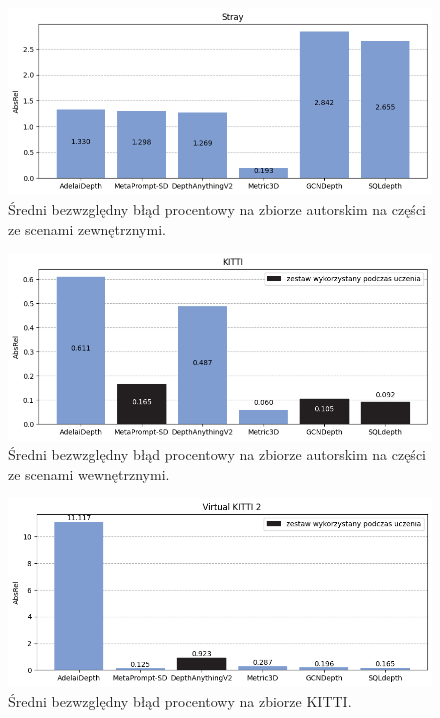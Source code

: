 \begin{figure}[H]
    \centering
    \includegraphics{plots/absrel/3}
    \caption{Średni bezwzględny błąd procentowy na zbiorze autorskim na części ze scenami zewnętrznymi.}
    \label{fig:absrel_3}
\end{figure}
\begin{figure}[H]
    \centering
    \includegraphics{plots/absrel/4}
    \caption{Średni bezwzględny błąd procentowy na zbiorze autorskim na części ze scenami wewnętrznymi.}
    \label{fig:absrel_4}
\end{figure}
\begin{figure}[H]
    \centering
    \includegraphics{plots/absrel/5}
    \caption{Średni bezwzględny błąd procentowy na zbiorze KITTI.}
    \label{fig:absrel_5}
\end{figure}
